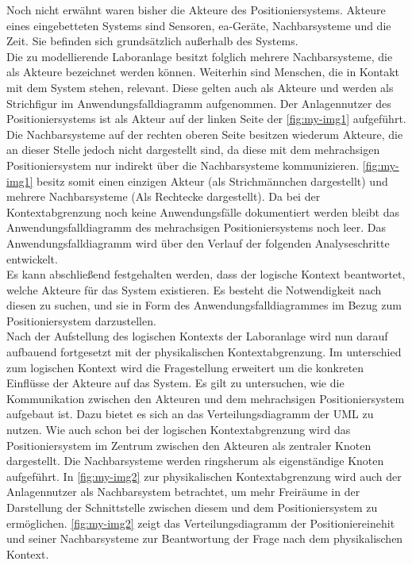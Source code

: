 \documentclass[../../../Bachelorarbeit.tex]{subfiles}
\begin{document}
Noch nicht erwähnt waren bisher die Akteure des Positioniersystems. Akteure eines eingebetteten Systems sind Sensoren, \acs{ea}-Geräte, Nachbarsysteme und die Zeit. Sie befinden sich grundsätzlich außerhalb des Systems. \\ %
Die zu modellierende Laboranlage besitzt folglich mehrere Nachbarsysteme, die als Akteure bezeichnet werden können. Weiterhin sind Menschen, die in Kontakt mit dem System stehen, relevant. Diese gelten auch als Akteure und werden als Strichfigur im Anwendungsfalldiagramm aufgenommen. Der Anlagennutzer des Positioniersystems ist als Akteur auf der linken Seite der \autoref{fig:my-img1} aufgeführt. Die Nachbarsysteme auf der rechten oberen Seite besitzen wiederum Akteure, die an dieser Stelle jedoch nicht dargestellt sind, da diese mit dem mehrachsigen Positioniersystem nur indirekt über die Nachbarsysteme kommunizieren. \autoref{fig:my-img1} besitz somit einen einzigen Akteur (als Strichmännchen dargestellt) und mehrere Nachbarsysteme (Als Rechtecke dargestellt). Da bei der Kontextabgrenzung noch keine Anwendungsfälle dokumentiert werden bleibt das Anwendungsfalldiagramm des mehrachsigen Positioniersystems noch leer. Das Anwendungsfalldiagramm wird über den Verlauf der folgenden Analyseschritte entwickelt.\\
Es kann abschließend festgehalten werden, dass der logische Kontext beantwortet, welche Akteure für das System existieren. Es besteht die Notwendigkeit nach diesen zu suchen, und sie in Form des Anwendungsfalldiagrammes im Bezug zum Positioniersystem darzustellen.\\
Nach der Aufstellung des logischen Kontexts der Laboranlage wird nun darauf aufbauend fortgesetzt mit der physikalischen Kontextabgrenzung. Im unterschied zum logischen Kontext wird die Fragestellung erweitert um die konkreten Einflüsse der Akteure auf das System. Es gilt zu untersuchen, wie die Kommunikation zwischen den Akteuren und dem mehrachsigen Positioniersystem aufgebaut ist. Dazu bietet es sich an das Verteilungsdiagramm der UML zu nutzen. Wie auch schon bei der logischen Kontextabgrenzung wird das Positioniersystem im Zentrum zwischen den Akteuren als zentraler Knoten dargestellt. Die Nachbarsysteme werden ringsherum als eigenständige Knoten aufgeführt. In \autoref{fig:my-img2} zur physikalischen Kontextabgrenzung wird auch der Anlagennutzer als Nachbarsystem betrachtet, um mehr Freiräume in der Darstellung der Schnittstelle zwischen diesem und dem Positioniersystem zu ermöglichen. \autoref{fig:my-img2} zeigt das Verteilungsdiagramm der Positioniereinehit und seiner Nachbarsysteme zur Beantwortung der Frage nach dem physikalischen Kontext.\\
\end{document}
